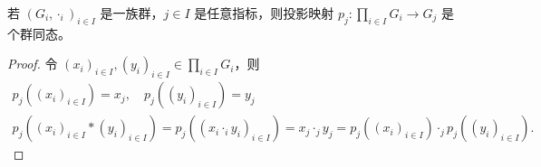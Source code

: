 \documentclass[../../main.tex]{subfiles}
\begin{document}
\begin{proposition}[投影映射是群同态]\label{proposition:投影映射是群同态}
若 $(G_i,\cdot_i)_{i\in I}$ 是一族群，$j\in I$ 是任意指标，则投影映射 $p_j:\prod_{i\in I}G_i\to G_j$ 是个群同态。
\end{proposition}
\begin{proof}
令 $(x_i)_{i\in I},(y_i)_{i\in I}\in\prod_{i\in I}G_i$，则
\begin{gather*}
p_j((x_i)_{i\in I})=x_j,\quad p_j((y_i)_{i\in I})=y_j\\
p_j((x_i)_{i\in I}*(y_i)_{i\in I})=p_j((x_i\cdot_i y_i)_{i\in I})=x_j\cdot_j y_j = p_j((x_i)_{i\in I})\cdot_j p_j((y_i)_{i\in I}).
\end{gather*}
\end{proof}
\end{document}
